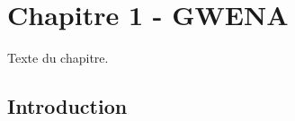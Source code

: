 \setcounter{chapter}{2}
\chapter*{Chapitre 1 - GWENA}

Texte du chapitre.

\section{Introduction}


